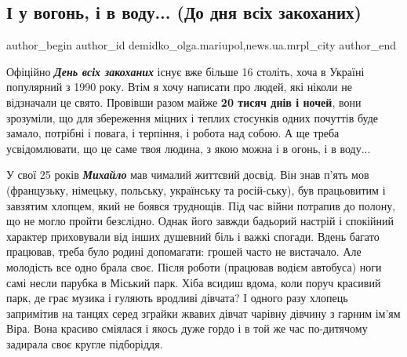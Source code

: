  
 
 
 
 
 
\subsection{І у вогонь, і в воду... (До дня всіх закоханих)}
\label{sec:14_02_2020.stz.news.ua.mrpl_city.1.i_u_vogon_i_v_vodu}
 
\ifcmt
 author_begin
   author_id demidko_olga.mariupol,news.ua.mrpl_city
 author_end
\fi


Офіційно \emph{\textbf{День всіх закоханих}} існує вже більше 16 століть, хоча в Україні
популярний з 1990 року. Втім я хочу написати про людей, які ніколи не
відзначали це свято. Провівши разом майже \textbf{20 тисяч днів і ночей}, вони
зрозуміли, що для збереження міцних і теплих стосунків одних почуттів буде
замало, потрібні і повага, і терпіння, і робота над собою. А ще треба
усвідомлювати, що це саме твоя людина, з якою можна і в огонь, і в воду... 


У свої 25 років \emph{\textbf{Михайло}} мав чималий життєвий досвід. Він знав п'ять мов
(французьку, німецьку, польську, українську та росій\hyp{}ську), був працьовитим і
завзятим хлопцем, який не боявся труднощів. Під час війни потрапив до полону,
що не могло пройти безслідно. Однак його завжди бадьорий настрій і спокійний
характер приховували від інших душевний біль і важкі спогади. Вдень багато
працював, треба було родині допомагати: грошей часто не вистачало. Але
молодість все одно брала своє. Після роботи (працював водієм автобуса) ноги
самі несли парубка в Міський парк. Хіба всидиш вдома, коли поруч красивий парк,
де грає музика і гуляють вродливі дівчата? І одного разу хлопець запримітив на
танцях серед зграйки жвавих дівчат чарівну дівчину з гарним ім'ям Віра. Вона
красиво сміялася і якось дуже гордо і в той же час по-дитячому задирала своє
кругле підборіддя.

